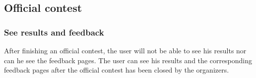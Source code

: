 \subsection*{Official contest}

\subsubsection*{See results and feedback}
After finishing an official contest, the user will not be able to see his results nor can he see the feedback pages. The user can see his results and the corresponding feedback pages after the official contest has been closed by the organizers. 

